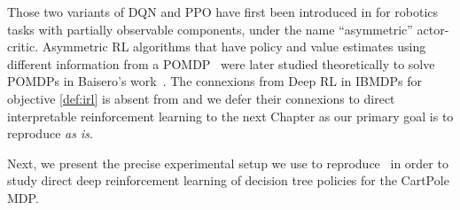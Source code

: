 Those two variants of DQN and PPO have first been introduced in \cite{pinto} for robotics tasks with partially observable components, under the name ``asymmetric'' actor-critic. 
Asymmetric RL algorithms that have policy and value estimates using different information from a POMDP~\cite{POMDP,chap2} were later studied theoretically to solve POMDPs in Baisero's work~\cite{baisero-dqn,baisero-ppo}.
The connexions from Deep RL in IBMDPs for objective \ref{def:irl} is absent from \cite{topin2021iterative} and we defer their connexions to direct interpretable reinforcement learning to the next Chapter as our primary goal is to reproduce \cite{topin2021iterative} \textit{as is}.

Next, we present the precise experimental setup we use to reproduce~\cite[Table 1]{topin2021iterative} in order to study direct deep reinforcement learning of decision tree policies for the CartPole MDP.

